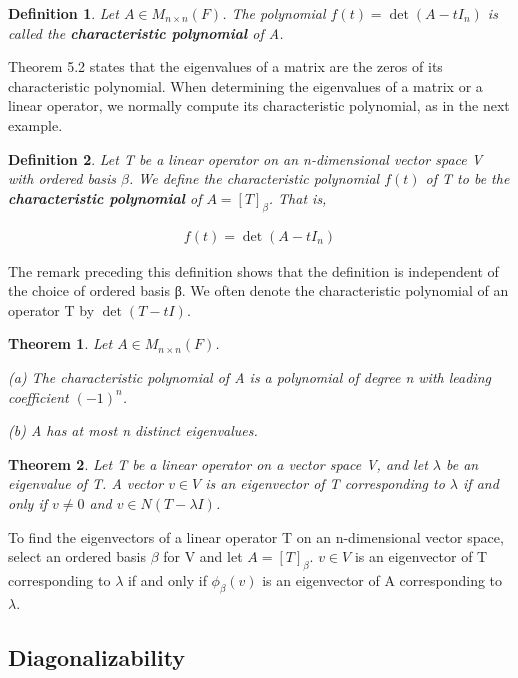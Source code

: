 \documentclass{article}
\newcommand{\bd}[1]{\textbf{#1}}
\theoremstyle{plain}
\newtheorem{theorem}{Theorem}[section]
\newtheorem*{definition1}{Definition}
\theoremstyle{plain} %
\begin{document}
\begin{definition1}
  Let $A \in M_{n\times n}(F)$. The polynomial $f(t) = \det(A − tI_n)$ is called the \bd{characteristic polynomial} of A.
\end{definition1}

Theorem 5.2 states that the eigenvalues of a matrix are the zeros of its characteristic polynomial. When determining the eigenvalues of a matrix or a linear operator, we normally compute its characteristic polynomial, as in the next example.

\begin{definition1}
  Let T be a linear operator on an n-dimensional vector space V with ordered basis $\beta$. We define the characteristic polynomial $f(t)$ of T to be the \bd{characteristic polynomial} of $A = [T]_\beta$. That is,

  \begin{align*}
    f(t)=\det(A-tI_n)
  \end{align*}
\end{definition1}

The remark preceding this definition shows that the definition is independent of the choice of ordered basis β. We often denote
the characteristic polynomial of an operator T by $\det(T − tI)$.

\begin{theorem}
  Let $A \in M_{n\times n}(F)$.

(a) The characteristic polynomial of A is a polynomial of degree n with leading coefficient ${(−1)}^n$.

(b) A has at most n distinct eigenvalues.
\end{theorem}

\begin{theorem}
  Let T be a linear operator on a vector space V, and let $\lambda$ be an eigenvalue of T. A vector $v \in V$ is an eigenvector of T corresponding to $\lambda$ if and only if $v \neq 0$ and $v \in N(T − \lambda I)$.
\end{theorem}

To find the eigenvectors of a linear operator T on an n-dimensional vector space, select an ordered basis $\beta$ for V and let $A = [T]_\beta$. $v \in V$ is an eigenvector of T corresponding to $\lambda$ if and only if $\phi_\beta(v)$ is an eigenvector of A corresponding to $\lambda$.

\subsection{Diagonalizability}
\end{document}
